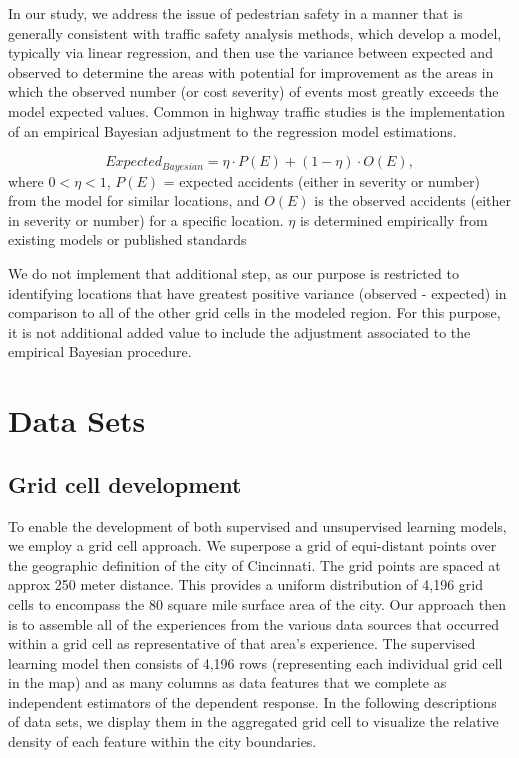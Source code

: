 \documentclass{llncs}
\begin{document}
In our study, we address the issue of pedestrian safety in a manner that is generally consistent with traffic safety analysis methods, which develop a model, typically via linear regression,  and then use the variance between expected and observed to determine the areas with potential for improvement as the areas in which the observed number (or cost severity) of events most greatly exceeds the model expected values. Common in highway traffic studies is the implementation of an empirical Bayesian adjustment to the regression model estimations.

\begin{equation} Expected_{Bayesian} = \eta \cdot P(E)  + (1 - \eta) \cdot O(E),
\end{equation} \newline
where $0 < \eta < 1$, $P(E)$ = expected accidents (either in severity or number) from the model for similar locations, and
$O(E)$ is the observed accidents (either in severity or number) for a specific location. $\eta$ is determined empirically from existing models or published standards\cite{kol2014highway}

We do not implement that additional step, as our purpose is restricted to identifying locations that have greatest positive variance (observed - expected) in comparison to all of the other grid cells in the modeled region. For this purpose, it is not additional added value to include the adjustment associated to the empirical Bayesian procedure.

\section{Data Sets}


\subsection{Grid cell development}

To enable the development of both supervised and unsupervised learning models, we employ a grid cell approach. We superpose a grid of equi-distant points over the geographic definition of the city of Cincinnati. The grid points are spaced at approx 250 meter distance. This provides a uniform distribution of 4,196 grid cells to encompass the 80 square mile surface area of the city. Our approach then is to assemble all of the experiences from the various data sources that occurred within a grid cell as representative of that area's experience. The supervised learning model then consists of 4,196 rows (representing each individual grid cell in the map) and as many columns as data features that we complete as independent estimators of the dependent response. In the following descriptions of data sets, we display them in the aggregated grid cell to visualize the relative density of each feature within the city boundaries. 
\end{document}
